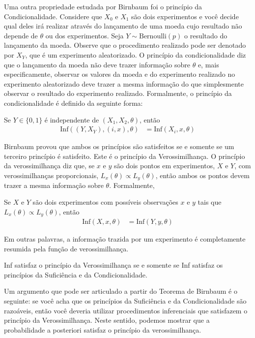 Uma outra propriedade estudada por Birnbaum foi
o princípio da Condicionalidade.
Considere que $X_{0}$ e $X_{1}$ são 
dois experimentos e você decide qual 
deles irá realizar através do lançamento de 
uma moeda cujo resultado não depende de $\theta$ ou 
dos experimentos. Seja $Y \sim \text{Bernoulli}(p)$ 
o resultado do lançamento da moeda.
Observe que o procedimento realizado pode ser denotado
por $X_{Y}$, que é um experimento aleatorizado.
O princípio da condicionalidade diz que 
o lançamento da moeda não deve trazer
informação sobre $\theta$ e, mais especificamente,
observar os valores da moeda e 
do experimento realizado no experimento aleatorizado
deve trazer a mesma informação do que simplesmente 
observar o resultado do experimento realizado.
Formalmente, o princípio da condicionalidade é 
definido da seguinte forma:
\begin{definition}
 Se $Y \in \{0,1\}$ é independente de 
 $(X_{1}, X_{2}, \theta)$, então 
 \begin{align*}
  \text{Inf}((Y,X_{Y}),(i,x),\theta) 
  &= \text{Inf}(X_{i},x,\theta)
 \end{align*}
\end{definition}
 
Birnbaum provou que ambos os princípios são 
satisfeitos  se e somente se um terceiro 
princípio é satisfeito.
Este é o princípio da Verossimilhança.
O princípio da verossimilhança diz que,
se $x$ e $y$ são dois pontos em experimentos, 
$X$ e $Y$, com verossimilhanças proporcionais,
$L_{x}(\theta) \propto L_{y}(\theta)$, então 
ambos os pontos devem trazer a 
mesma informação sobre $\theta$.
Formalmente,
\begin{definition}
 Se $X$ e $Y$ são dois experimentos com 
 possíveis observações $x$ e $y$ tais que
 $L_{x}(\theta) \propto L_{y}(\theta)$, então
 \begin{align*}
  \text{Inf}(X,x,\theta) 
  &= \text{Inf}(Y,y,\theta)
 \end{align*}
\end{definition}
Em outras palavras, a informação trazida por um
experimento é completamente resumida pela função de verossimilhança.
\begin{theorem}
 Inf satisfaz o princípio da Verossimilhança
 se e somente se Inf satisfaz 
 os princípios da Suficiência e 
 da Condicionalidade.
\end{theorem}

Um argumento que pode ser articulado a partir
do Teorema de Birnbaum é o seguinte:
se você acha que os princípios da Suficiência e 
da Condicionalidade são razoáveis, então 
você deveria utilizar procedimentos inferenciais que
satisfazem o princípio da Verossimilhança.
Neste sentido, podemos mostrar que 
a probabilidade a posteriori satisfaz 
o princípio da verossimilhança.

